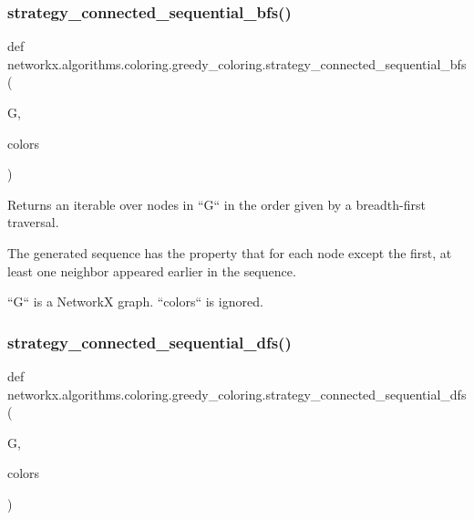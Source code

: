 \subsubsection{\texorpdfstring{strategy\+\_\+connected\+\_\+sequential\+\_\+bfs()}{strategy\_connected\_sequential\_bfs()}}
{\footnotesize\ttfamily def networkx.\+algorithms.\+coloring.\+greedy\+\_\+coloring.\+strategy\+\_\+connected\+\_\+sequential\+\_\+bfs (\begin{DoxyParamCaption}\item[{}]{G,  }\item[{}]{colors }\end{DoxyParamCaption})}

\begin{DoxyVerb}Returns an iterable over nodes in ``G`` in the order given by a
breadth-first traversal.

The generated sequence has the property that for each node except
the first, at least one neighbor appeared earlier in the sequence.

``G`` is a NetworkX graph. ``colors`` is ignored.\end{DoxyVerb}
 \mbox{\label{namespacenetworkx_1_1algorithms_1_1coloring_1_1greedy__coloring_a083f2c34bf925c991005f37b6b68630a}} 
\subsubsection{\texorpdfstring{strategy\+\_\+connected\+\_\+sequential\+\_\+dfs()}{strategy\_connected\_sequential\_dfs()}}
{\footnotesize\ttfamily def networkx.\+algorithms.\+coloring.\+greedy\+\_\+coloring.\+strategy\+\_\+connected\+\_\+sequential\+\_\+dfs (\begin{DoxyParamCaption}\item[{}]{G,  }\item[{}]{colors }\end{DoxyParamCaption})}

